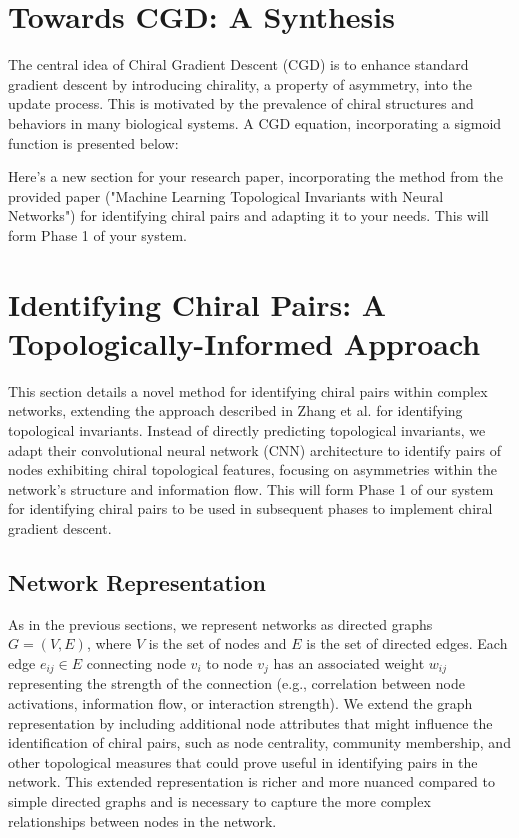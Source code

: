 \documentclass[12pt, a4paper]{article}
\begin{document}
\section{Towards CGD: A Synthesis}

The central idea of Chiral Gradient Descent (CGD) is to enhance standard gradient descent by introducing chirality, a property of asymmetry, into the update process.  This is motivated by the prevalence of chiral structures and behaviors in many biological systems.  A CGD equation, incorporating a sigmoid function is presented below:



Here's a new section for your research paper, incorporating the method from the provided paper ("Machine Learning Topological Invariants with Neural Networks") for identifying chiral pairs and adapting it to your needs.  This will form Phase 1 of your system.


\section{Identifying Chiral Pairs: A Topologically-Informed Approach}

This section details a novel method for identifying chiral pairs within complex networks, extending the approach described in Zhang et al. \cite{zhang2018machine} for identifying topological invariants.  Instead of directly predicting topological invariants, we adapt their convolutional neural network (CNN) architecture to identify pairs of nodes exhibiting chiral topological features, focusing on asymmetries within the network's structure and information flow.  This will form Phase 1 of our system for identifying chiral pairs to be used in subsequent phases to implement chiral gradient descent.

\subsection{Network Representation}

As in the previous sections, we represent networks as directed graphs $G = (V, E)$, where $V$ is the set of nodes and $E$ is the set of directed edges. Each edge $e_{ij} \in E$ connecting node $v_i$ to node $v_{j}$ has an associated weight $w_{ij}$ representing the strength of the connection (e.g., correlation between node activations, information flow, or interaction strength). We extend the graph representation by including additional node attributes that might influence the identification of chiral pairs, such as node centrality, community membership, and other topological measures that could prove useful in identifying pairs in the network.  This extended representation is richer and more nuanced compared to simple directed graphs and is necessary to capture the more complex relationships between nodes in the network.
\end{document}
